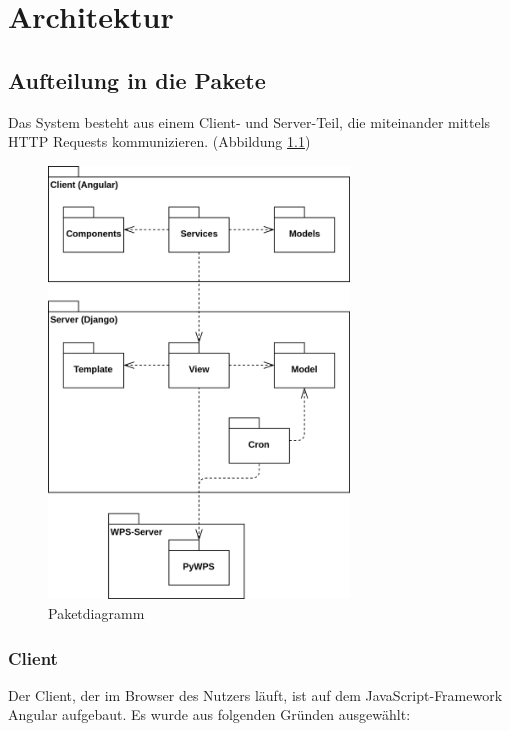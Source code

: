 \chapter{Architektur}

    \section{Aufteilung in die Pakete}

    \noindent Das System besteht aus einem \gls{Client}- und \gls{Server}-Teil, die miteinander mittels HTTP Requests kommunizieren. (Abbildung \ref{fig:arch_package_division})
    
    \begin{figure}[h]
        \centering
        \includegraphics[width=8cm]{images/package_diagram.png}
        \caption{Paketdiagramm}
        \label{fig:arch_package_division}
    \end{figure}
    
        \subsection{Client}
        
        Der Client, der im Browser des Nutzers läuft, ist auf dem JavaScript-Framework Angular aufgebaut. Es wurde aus folgenden Gründen ausgewählt:
        
